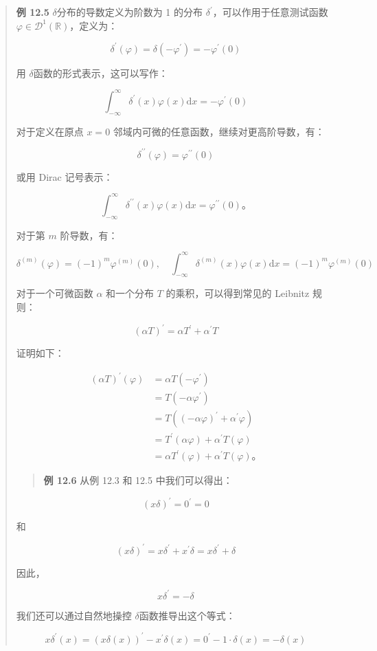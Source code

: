 \begin{quote}
\textbf{例 12.5} $\delta$分布的导数定义为阶数为 1 的分布
\(\delta^{\prime}\)，可以作用于任意测试函数
\(\varphi \in \mathcal{D}^1(\mathbb{R})\)，定义为：

\[
\delta^{\prime}(\varphi) = \delta\left(-\varphi^{\prime}\right) = -\varphi^{\prime}(0)
\]

用 $\delta$函数的形式表示，这可以写作：

\[
\int_{-\infty}^\infty \delta^{\prime}(x) \varphi(x) \mathrm{d}x = -\varphi^{\prime}(0)
\]

对于定义在原点 \(x=0\) 邻域内可微的任意函数，继续对更高阶导数，有：

\[
\delta^{\prime\prime}(\varphi) = \varphi^{\prime\prime}(0)
\]

或用 Dirac 记号表示：

\[
\int_{-\infty}^\infty \delta^{\prime\prime}(x) \varphi(x) \mathrm{d}x = \varphi^{\prime\prime}(0)。
\]

对于第 \(m\) 阶导数，有：

\[
\delta^{(m)}(\varphi) = (-1)^m \varphi^{(m)}(0), \quad \int_{-\infty}^\infty \delta^{(m)}(x) \varphi(x) \mathrm{d}x = (-1)^m \varphi^{(m)}(0)
\]

对于一个可微函数 \(\alpha\) 和一个分布 \(T\) 的乘积，可以得到常见的
Leibnitz 规则：

\[
(\alpha T)^{\prime} = \alpha T^{\prime} + \alpha^{\prime} T
\]

证明如下：

\[
\begin{aligned}
(\alpha T)^{\prime}(\varphi) & = \alpha T\left(-\varphi^{\prime}\right) \\
& = T\left(-\alpha \varphi^{\prime}\right) \\
& = T\left((-\alpha \varphi)^{\prime} + \alpha^{\prime} \varphi\right) \\
& = T^{\prime}(\alpha \varphi) + \alpha^{\prime} T(\varphi) \\
& = \alpha T^{\prime}(\varphi) + \alpha^{\prime} T(\varphi)。
\end{aligned}
\]

\begin{quote}
\textbf{例 12.6} 从例 12.3 和 12.5 中我们可以得出：
\end{quote}

\[
(x \delta)^{\prime} = 0^{\prime} = 0
\]

和

\[
(x \delta)^{\prime} = x \delta^{\prime} + x^{\prime} \delta = x \delta^{\prime} + \delta
\]

因此，

\[
x \delta^{\prime} = -\delta
\]

我们还可以通过自然地操控 $\delta$函数推导出这个等式：

\[
x \delta^{\prime}(x) = (x \delta(x))^{\prime} - x^{\prime} \delta(x) = 0^{\prime} - 1 \cdot \delta(x) = -\delta(x)
\]
\end{quote}

